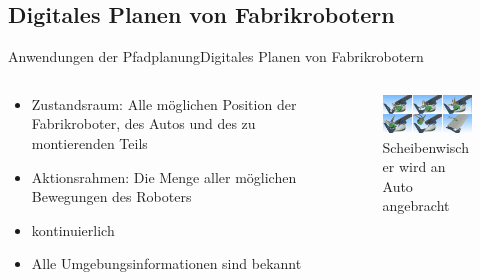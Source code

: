 \documentclass[t,aspectratio=169,dvipsnames]{beamer}
\begin{document}
\subsection{Digitales Planen von Fabrikrobotern}
\begin{frame}{Anwendungen der Pfadplanung}{Digitales Planen von Fabrikrobotern}
	\begin{columns}
		\begin{column}[T]{0.5\textwidth}
			\begin{itemize}[<+->]
				\item Zustandsraum: Alle möglichen Position der Fabrikroboter, des Autos und des zu montierenden Teils
				\item Aktionsrahmen: Die Menge aller möglichen Bewegungen des Roboters
				\item kontinuierlich
				\item Alle Umgebungsinformationen sind bekannt
			\end{itemize}
		\end{column}
		\begin{column}[T]{0.5\textwidth}
			\begin{figure}
				\includegraphics[width=7.0cm]{images/img231.png}
				\caption{Scheibenwischer wird an Auto angebracht} 
			\end{figure}
		\end{column}
	\end{columns}
\end{frame}
\end{document}

